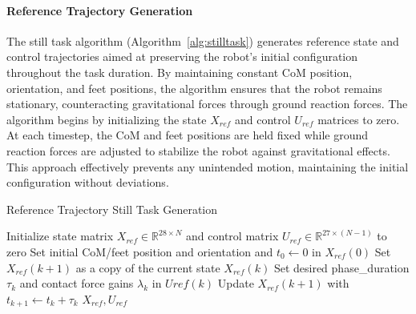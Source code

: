 \documentclass[main.tex]{subfiles}
\begin{document}
\begin{sloppypar}
\paragraph{Reference Trajectory Generation}  
The still task algorithm (Algorithm~\ref{alg:stilltask}) generates reference state and control trajectories aimed at preserving the robot’s initial configuration throughout the task duration. By maintaining constant CoM position, orientation, and feet positions, the algorithm ensures that the robot remains stationary, counteracting gravitational forces through ground reaction forces. The algorithm begins by initializing the state \( X_{ref} \) and control \( U_{ref} \) matrices to zero. At each timestep, the CoM and feet positions are held fixed while ground reaction forces are adjusted to stabilize the robot against gravitational effects. This approach effectively prevents any unintended motion, maintaining the initial configuration without deviations.\\
\begin{algorithm}[H]
\caption{Reference Trajectory Still Task Generation}
\label{alg:stilltask}
\begin{algorithmic}[1]
\State Initialize state matrix \( X_{ref} \in \mathbb{R}^{28 \times N} \) and control matrix \( U_{ref} \in \mathbb{R}^{27 \times (N-1)} \) to zero
\State Set initial CoM/feet position and orientation and $t_0 \gets 0$ in \( X_{ref}(0) \)
    \State Set \( X_{ref}(k+1) \) as a copy of the current state \( X_{ref}(k) \)
    \State Set desired phase\_duration $\tau_k$ and contact force gains $\lambda_k$ in  \( U{ref}(k) \)
    \State Update \( X_{ref}(k+1) \) with $t_{k+1} \gets t_k + \tau_k$
\EndFor
\State \Return \( X_{ref}, U_{ref} \)
\end{algorithmic}
\end{algorithm}

\end{sloppypar}
\end{document}

